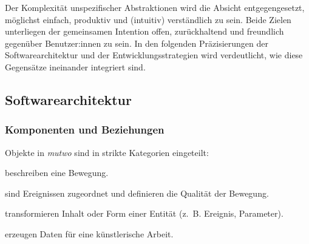 \documentclass[12pt,a4paper,ngerman]{article}
\begin{document}
Der Komplexität unspezifischer Abstraktionen wird die Absicht entgegengesetzt, möglichst einfach, produktiv und (intuitiv) verständlich zu sein.
Beide Zielen unterliegen der gemeinsamen Intention offen, zurückhaltend und freundlich gegenüber Benutzer:innen zu sein.
In den folgenden Präzisierungen der Softwarearchitektur und der Entwicklungsstrategien wird verdeutlicht, wie diese Gegensätze ineinander integriert sind.








\subsection{Softwarearchitektur}

\subsubsection{Komponenten und Beziehungen}

Objekte in \emph{mutwo} sind in strikte Kategorien eingeteilt:

\bigskip

\hspace{0.5cm}
\begin{minipage}{0.95\textwidth}
    \begin{description}[style=multiline, leftmargin=2.25cm, font=\normalfont\emph]
        \item[Ereignisse] beschreiben eine Bewegung.
        \item[Parameter] sind Ereignissen zugeordnet und definieren die Qualität der Bewegung.
        \item[Übersetzer] transformieren Inhalt oder Form einer Entität (z.~B. Ereignis, Parameter).
        \item[Generatoren] erzeugen Daten für eine künstlerische Arbeit.
    \end{description}
\end{minipage}
\end{document}

